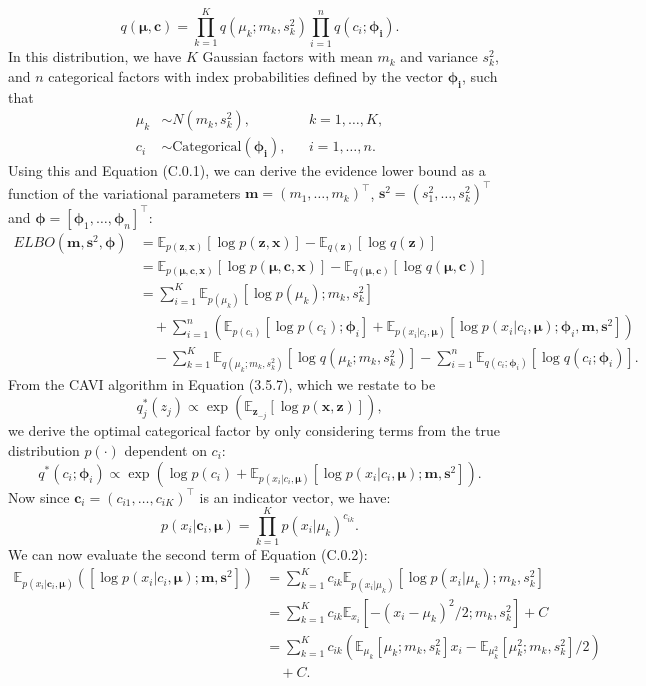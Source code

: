 \documentclass[honours,12pt]{unswthesis}
\newcommand{\E}{\mathbb{E}}
\numberwithin{equation}{section}
\theoremstyle{definition}
\begin{document}
\[q(\bm{\mu},\bm{c})=\prod^K_{k=1}q(\mu_k;m_k,s^2_k)\prod^n_{i=1}q(c_i;\bm{\phi_i}).\]
In this distribution, we have $K$ Gaussian factors with mean $m_k$ and variance $s^2_k$, and $n$ categorical factors with index probabilities defined by the vector $\bm{\phi_i}$, such that
\begin{align*}
\mu_k&\sim N(m_k,s^2_k), &&k=1,\dots,K,\\
c_i&\sim \text{Categorical}(\bm{\phi_i}), &&i=1,\dots,n.
\end{align*}
Using this and Equation (C.0.1), we can derive the evidence lower bound as a function of the variational parameters $\bm{m}=(m_1,\dots,m_k)^\top$, $\bm{s}^2=(s_1^2,\dots,s_k^2)^\top$ and $\bm{\phi}=[\bm{\phi}_1,\dots,\bm{\phi}_n]^\top$:
\begin{align*}
ELBO(\bm{m},\bm{s}^2,\bm{\phi})&=\mathbb{E}_{p(\textbf{z},\bm{x})}[\log p(\textbf{z},\bm{x})]-\mathbb{E}_{q(\bm{z})}[\log q(\bm{z})]\\
&=\mathbb{E}_{p(\bm{\mu,c},\textbf{x})}[\log p(\bm{\mu,c},\textbf{x})]-\mathbb{E}_{q(\bm{\mu,c})}[\log q(\bm{\mu,c})]\\
&=\sum^K_{i=1}\mathbb{E}_{p(\mu_k)}[\log p(\mu_k); m_k,s^2_k]\\
&\quad +\sum^n_{i=1}\left(\mathbb{E}_{p(c_i)}[\log p(c_i);\bm{\phi}_i]+\mathbb{E}_{p(x_i|c_i,\bm{\mu})}[\log p(x_i|c_i,\bm{\mu});\bm{\phi}_i,\bm{m},\bm{s}^2]\right)\\
&\quad -\sum^K_{k=1}\mathbb{E}_{q(\mu_k;m_k,s^2_k)}[\log q(\mu_k;m_k,s^2_k)]-\sum^n_{i=1}\mathbb{E}_{q(c_i;\bm{\phi}_i)}[\log q(c_i;\bm{\phi}_i)].
\end{align*}
From the CAVI algorithm in Equation (3.5.7), which we restate to be \[q^*_j(z_j)\propto \exp \left(\E_{\bm{z}_{-j}}[\log p(\bm{x},\bm{z})]\right),\]we derive the optimal categorical factor by only considering terms from the true distribution $p(\cdot)$ dependent on $c_i$:
\begin{equation}
q^*(c_i;\bm{\phi}_i)\propto \exp\left(\log p(c_i)+\mathbb{E}_{p(x_i|c_i,\bm{\mu})}[\log p(x_i|c_i,\bm{\mu});\bm{m},\bm{s}^2]\right).
\end{equation}
Now since $\bm{c}_i=(c_{i1},\dots,c_{iK})^\top$ is an indicator vector, we have:
\[p(x_i|\bm{c}_i,\bm{\mu})=\prod^K_{k=1}p(x_i|\mu_k)^{c_{ik}}.\]
We can now evaluate the second term of Equation (C.0.2):
\begin{align*}
\mathbb{E}_{p(x_i|\bm{c}_i,\bm{\mu})}\left([\log p(x_i|c_i,\bm{\mu});\bm{m},\bm{s}^2]\right)&=\sum_{k=1}^K c_{ik}\mathbb{E}_{p(x_i|\mu_k)}[\log p(x_i|\mu_k);m_k,s^2_k]\\
&=\sum_{k=1}^K c_{ik}\mathbb{E}_{x_i}[-(x_i-\mu_k)^2/2;m_k,s^2_k]+C\\
&=\sum_{k=1}^Kc_{ik}\left(\mathbb{E}_{\mu_k}[\mu_k;m_k,s^2_k]x_i-\mathbb{E}_{\mu_k^2}[\mu^2_k;m_k,s^2_k]/2\right)\\
&\quad +C.
\end{align*}
\end{document}
